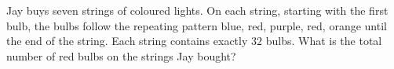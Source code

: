 Jay buys seven strings of coloured lights. On each string, starting with the first bulb, the bulbs follow the repeating pattern blue, red, purple, red, orange until the end of the string. Each string contains exactly $32$ bulbs. What is the total number of red bulbs on the strings Jay bought?
